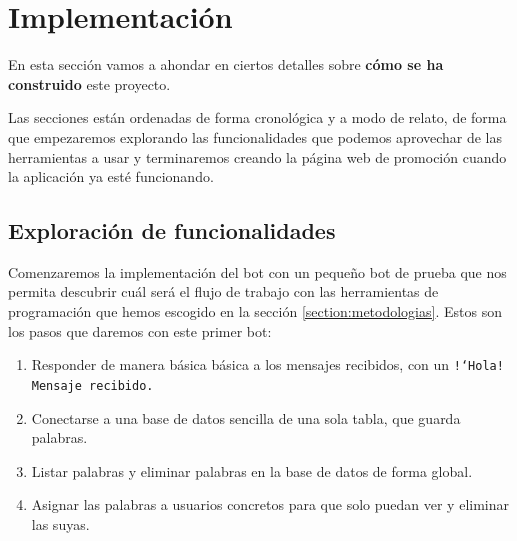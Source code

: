 \chapter{Implementación}

En esta sección vamos a ahondar en ciertos detalles sobre \textbf{cómo se ha construido} este proyecto.

Las secciones están ordenadas de forma cronológica y a modo de relato, de forma que empezaremos explorando las funcionalidades que podemos aprovechar de las herramientas a usar y terminaremos creando la página web de promoción cuando la aplicación ya esté funcionando.






\section{Exploración de funcionalidades}

Comenzaremos la implementación del bot con un pequeño bot de prueba que nos permita descubrir cuál será el flujo de trabajo con las herramientas de programación que hemos escogido en la sección \ref{section:metodologias}. Estos son los pasos que daremos con este primer bot:

\begin{enumerate}
    \item Responder de manera básica básica a los mensajes recibidos, con un \texttt{!`Hola! Mensaje recibido.}
    \item Conectarse a una base de datos sencilla de una sola tabla, que guarda palabras.
    \item Listar palabras y eliminar palabras en la base de datos de forma global.
    \item Asignar las palabras a usuarios concretos para que solo puedan ver y eliminar las suyas.
\end{enumerate}

